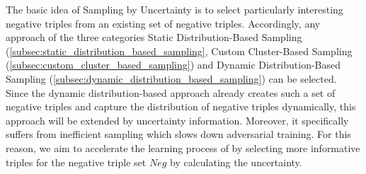 The basic idea of Sampling by Uncertainty is to select particularly interesting negative triples from an existing set of negative triples.
Accordingly, any approach of the three categories Static Distribution-Based Sampling (\autoref{subsec:static_distribution_based_sampling}, Custom Cluster-Based Sampling (\autoref{subsec:custom_cluster_based_sampling}) and Dynamic Distribution-Based Sampling (\autoref{subsec:dynamic_distribution_based_sampling}) can be selected.
Since the dynamic distribution-based approach \kbgan already creates such a set of negative triples and capture the distribution of negative triples dynamically, this approach will be extended by uncertainty information.
Moreover, it specifically suffers from inefficient sampling which slows down adversarial training.
For this reason, we aim to accelerate the learning process of \kbgan by selecting more informative triples for the negative triple set $Neg$ by calculating the uncertainty.













